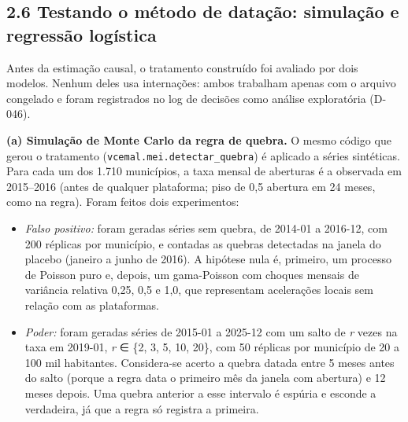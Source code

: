 \documentclass[
  11pt,
]{article}
\providecommand{\tightlist}{%
  \setlength{\itemsep}{0pt}\setlength{\parskip}{0pt}}
\begin{document}
\hypertarget{modelos-complementares-sobre-o-tratamento-exploratuxf3rios-sem-desfecho}{%
\subsection{2.6 Testando o método de datação: simulação e regressão logística}\label{modelos-complementares-sobre-o-tratamento-exploratuxf3rios-sem-desfecho}}

Antes da estimação causal, o tratamento construído foi avaliado por dois modelos. Nenhum deles usa internações: ambos trabalham apenas com o arquivo congelado e foram registrados no log de decisões como análise exploratória (D-046).

\textbf{(a) Simulação de Monte Carlo da regra de quebra.} O mesmo código que gerou o tratamento (\texttt{vcemal.mei.detectar\_quebra}) é aplicado a séries sintéticas. Para cada um dos 1.710 municípios, a taxa mensal de aberturas é a observada em 2015--2016 (antes de qualquer plataforma; piso de 0,5 abertura em 24 meses, como na regra). Foram feitos dois experimentos:

\begin{itemize}
\tightlist
\item
  \emph{Falso positivo:} foram geradas séries sem quebra, de 2014-01 a 2016-12, com 200 réplicas por município, e contadas as quebras detectadas na janela do placebo (janeiro a junho de 2016). A hipótese nula é, primeiro, um processo de Poisson puro e, depois, um gama-Poisson com choques mensais de variância relativa 0,25, 0,5 e 1,0, que representam acelerações locais sem relação com as plataformas.
\item
  \emph{Poder:} foram geradas séries de 2015-01 a 2025-12 com um salto de \emph{r} vezes na taxa em 2019-01, \emph{r} ∈ \{2, 3, 5, 10, 20\}, com 50 réplicas por município de 20 a 100 mil habitantes. Considera-se acerto a quebra datada entre 5 meses antes do salto (porque a regra data o primeiro mês da janela com abertura) e 12 meses depois. Uma quebra anterior a esse intervalo é espúria e esconde a verdadeira, já que a regra só registra a primeira.
\end{itemize}
\end{document}
